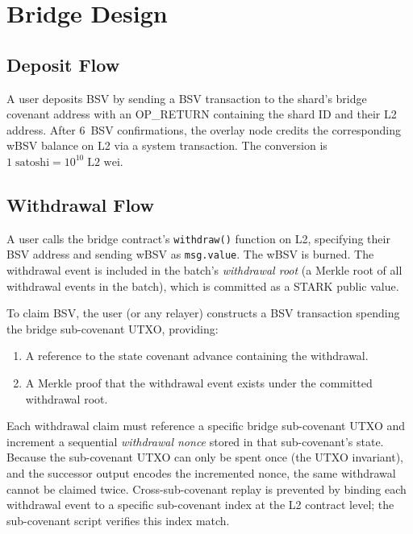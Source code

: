\documentclass[11pt,twocolumn]{article}
\begin{document}
\section{Bridge Design}
\label{sec:bridge}

\subsection{Deposit Flow}

A user deposits BSV by sending a BSV transaction to the shard's bridge covenant address with an OP\_RETURN containing the shard ID and their L2 address. After 6~BSV confirmations, the overlay node credits the corresponding wBSV balance on L2 via a system transaction. The conversion is $1\;\text{satoshi} = 10^{10}\;\text{L2 wei}$.

\subsection{Withdrawal Flow}

A user calls the bridge contract's \texttt{withdraw()} function on L2, specifying their BSV address and sending wBSV as \texttt{msg.value}. The wBSV is burned. The withdrawal event is included in the batch's \emph{withdrawal root} (a Merkle root of all withdrawal events in the batch), which is committed as a STARK public value.

To claim BSV, the user (or any relayer) constructs a BSV transaction spending the bridge sub-covenant UTXO, providing:

\begin{enumerate}[nosep,leftmargin=1.5em]
\item A reference to the state covenant advance containing the withdrawal.
\item A Merkle proof that the withdrawal event exists under the committed withdrawal root.
\end{enumerate}

Each withdrawal claim must reference a specific bridge sub-covenant UTXO and increment a sequential \emph{withdrawal nonce} stored in that sub-covenant's state. Because the sub-covenant UTXO can only be spent once (the UTXO invariant), and the successor output encodes the incremented nonce, the same withdrawal cannot be claimed twice. Cross-sub-covenant replay is prevented by binding each withdrawal event to a specific sub-covenant index at the L2 contract level; the sub-covenant script verifies this index match.
\end{document}
